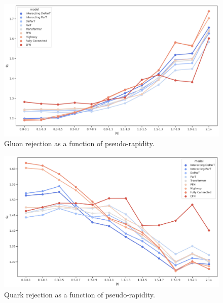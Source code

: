 \begin{figure}[htb]
    \centering
    \includegraphics[width=1\linewidth]{src/plots/results/eta_dep/gluon_rejection.jpg}
    \caption{Gluon rejection as a function of pseudo-rapidity.}
    \label{fig:gluon_rej_eta}
\end{figure}

\begin{figure}[htb]
    \centering
    \includegraphics[width=1\linewidth]{src/plots/results/eta_dep/quark_rejection.jpg}
    \caption{Quark rejection as a function of pseudo-rapidity.}
    \label{fig:quark_rej_eta}
\end{figure}

